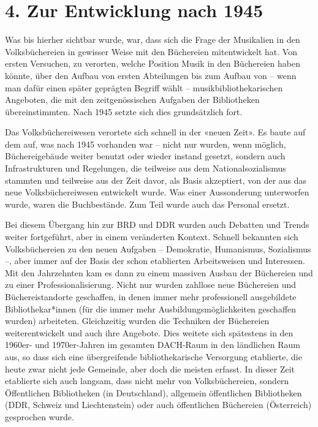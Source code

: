 \documentclass[a4paper,
fontsize=11pt,
oneside,
numbers=noperiodatend,
parskip=half-,
bibliography=totoc,
final
]{scrartcl}
\begin{document}
\hypertarget{zur-entwicklung-nach-1945}{%
\section{4. Zur Entwicklung nach
1945}\label{zur-entwicklung-nach-1945}}

Was bis hierher sichtbar wurde, war, dass sich die Frage der Musikalien
in den Volksbüchereien in gewisser Weise mit den Büchereien
mitentwickelt hat. Von ersten Versuchen, zu verorten, welche Position
Musik in den Büchereien haben könnte, über den Aufbau von ersten
Abteilungen bis zum Aufbau von -- wenn man dafür einen später geprägten
Begriff wählt -- musikbibliothekarischen Angeboten, die mit den
zeitgenössischen Aufgaben der Bibliotheken übereinstimmten. Nach 1945
setzte sich dies grundsätzlich fort.

Das Volksbüchereiwesen verortete sich schnell in der «neuen Zeit». Es
baute auf dem auf, was nach 1945 vorhanden war -- nicht nur wurden, wenn
möglich, Büchereigebäude weiter benutzt oder wieder instand gesetzt,
sondern auch Infrastrukturen und Regelungen, die teilweise aus dem
Nationalsozialismus stammten und teilweise aus der Zeit davor, als Basis
akzeptiert, von der aus das neue Volksbüchereiwesen entwickelt wurde.
Was einer Aussonderung unterworfen wurde, waren die Buchbestände. Zum
Teil wurde auch das Personal ersetzt.

Bei diesem Übergang hin zur BRD und DDR wurden auch Debatten und Trends
weiter fortgeführt, aber in einem veränderten Kontext. Schnell bekannten
sich Volksbüchereien zu den neuen Aufgaben -- Demokratie, Humanismus,
Sozialismus --, aber immer auf der Basis der schon etablierten
Arbeitsweisen und Interessen. Mit den Jahrzehnten kam es dann zu einem
massiven Ausbau der Büchereien und zu einer Professionalisierung. Nicht
nur wurden zahllose neue Büchereien und Büchereistandorte geschaffen, in
denen immer mehr professionell ausgebildete Bibliothekar*innen (für die
immer mehr Ausbildungsmöglichkeiten geschaffen wurden) arbeiteten.
Gleichzeitig wurden die Techniken der Büchereien weiterentwickelt und
auch ihre Angebote. Dies weitete sich spätestens in den 1960er- und
1970er-Jahren im gesamten DACH-Raum in den ländlichen Raum aus, so dass
sich eine übergreifende bibliothekarische Versorgung etablierte, die
heute zwar nicht jede Gemeinde, aber doch die meisten erfasst. In dieser
Zeit etablierte sich auch langsam, dass nicht mehr von Volksbüchereien,
sondern Öffentlichen Bibliotheken (in Deutschland), allgemein
öffentlichen Bibliotheken (DDR, Schweiz und Liechtenstein) oder auch
öffentlichen Büchereien (Österreich) gesprochen wurde.
\end{document}
